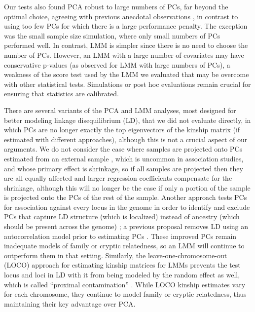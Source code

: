 \documentclass[11pt]{article}
\begin{document}
\begin{linenumbers}
Our tests also found PCA robust to large numbers of PCs, far beyond the optimal choice, agreeing with previous anecdotal observations \citep{price_principal_2006, kang_variance_2010}, in contrast to using too few PCs for which there is a large performance penalty.
The exception was the small sample size simulation, where only small numbers of PCs performed well.
In contrast, LMM is simpler since there is no need to choose the number of PCs.
However, an LMM with a large number of covariates may have conservative p-values (as observed for LMM with large numbers of PCs), a weakness of the score test used by the LMM we evaluated that may be overcome with other statistical tests.
Simulations or post hoc evaluations remain crucial for ensuring that statistics are calibrated.

There are several variants of the PCA and LMM analyses, most designed for better modeling linkage disequilibrium (LD), that we did not evaluate directly, in which PCs are no longer exactly the top eigenvectors of the kinship matrix (if estimated with different approaches), although this is not a crucial aspect of our arguments.
We do not consider the case where samples are projected onto PCs estimated from an external sample \citep{prive_efficient_2020}, which is uncommon in association studies, and whose primary effect is shrinkage, so if all samples are projected then they are all equally affected and larger regression coefficients compensate for the shrinkage, although this will no longer be the case if only a portion of the sample is projected onto the PCs of the rest of the sample.
Another approach tests PCs for association against every locus in the genome in order to identify and exclude PCs that capture LD structure (which is localized) instead of ancestry (which should be present across the genome) \citep{prive_efficient_2020}; a previous proposal removes LD using an autocorrelation model prior to estimating PCs \citep{patterson_population_2006}.
These improved PCs remain inadequate models of family or cryptic relatedness, so an LMM will continue to outperform them in that setting.
Similarly, the leave-one-chromosome-out (LOCO) approach for estimating kinship matrices for LMMs prevents the test locus and loci in LD with it from being modeled by the random effect as well, which is called ``proximal contamination'' \citep{lippert_fast_2011, yang_advantages_2014}.
While LOCO kinship estimates vary for each chromosome, they continue to model family or cryptic relatedness, thus maintaining their key advantage over PCA.

\end{linenumbers}
\end{document}
